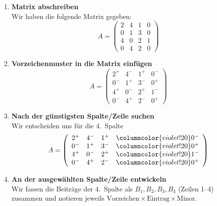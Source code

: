 \documentclass[a4paper,11pt,oneside,open=any,parskip=half, DIV=15]{scrreprt}
\begin{document}
      \begin{enumerate}
            \item \textbf{Matrix abschreiben}\\
               Wir haben die folgende Matrix gegeben:
               \[
                  A=
                  \begin{pmatrix}
                        2 & 4 & 1 & 0\\
                        0 & 1 & 3 & 0\\
                        4 & 0 & 2 & 1\\
                        0 & 4 & 2 & 0
                  \end{pmatrix}
               \]
            \item \textbf{Vorzeichenmuster in die Matrix einfügen}
               \[
                  A=
                  \begin{pmatrix}
                        2^{+} & 4^{-} & 1^{+} & 0^{-}\\
                        0^{-} & 1^{+} & 3^{-} & 0^{+}\\
                        4^{+} & 0^{-} & 2^{+} & 1^{-}\\
                        0^{-} & 4^{+} & 2^{-} & 0^{+}
                  \end{pmatrix}
               \]
            \item \textbf{Nach der günstigsten Spalte/Zeile suchen}\\
               Wir entscheiden uns für die 4.~Spalte 
               \[
                  A=
                        \left(
                           \begin{array}{ccc>{\columncolor{violet!20}}c}
                              2^{+} & 4^{-} & 1^{+} & 0^{-}\\
                              0^{-} & 1^{+} & 3^{-} & 0^{+}\\
                              4^{+} & 0^{-} & 2^{+} & 1^{-}\\
                              0^{-} & 4^{+} & 2^{-} & 0^{+}
                           \end{array}
                        \right)
                  \]
            \item \textbf{An der ausgewählten Spalte/Zeile entwickeln}\\
               Wir fassen die Beiträge der 4.~Spalte als \(B_1,B_2,B_3,B_4\) (Zeilen 1–4) zusammen und notieren jeweils \(\text{Vorzeichen}\times\text{Eintrag}\times\text{Minor}\).\\

\end{enumerate}
\end{document}
